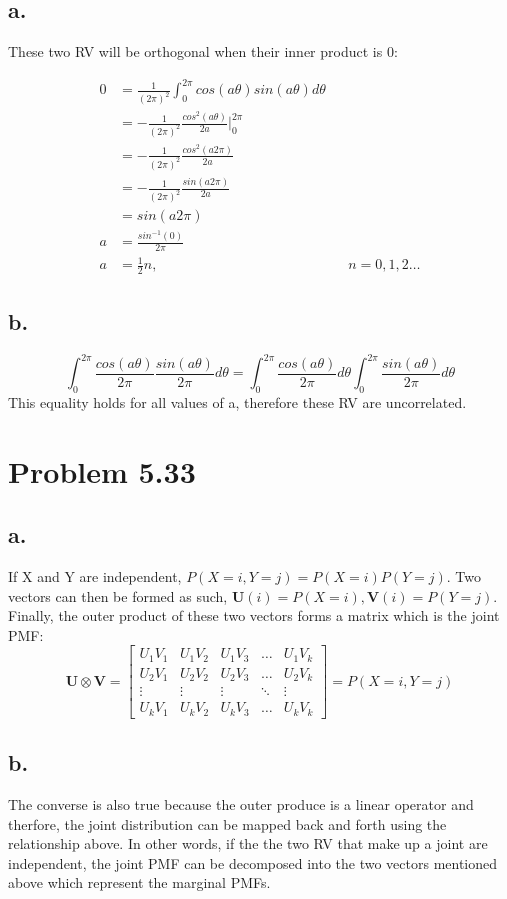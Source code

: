 \documentclass[12pt]{article}
\begin{document}
\subsection{a.}
These two RV will be orthogonal when their inner product is 0:

\begin{align*}
  0 &= \frac{1}{(2\pi)^2}\int_0^{2\pi} cos(a\theta)sin(a\theta) d\theta \\
  &= -\frac{1}{(2\pi)^2}\frac{cos^2(a\theta)}{2a}\big|_0^{2\pi} \\
  &= -\frac{1}{(2\pi)^2}\frac{cos^2(a2\pi)}{2a} \\
  &= -\frac{1}{(2\pi)^2}\frac{sin(a2\pi)}{2a} \\
  &= sin(a2\pi) \\
  a &= \frac{sin^{-1}(0)}{2\pi} \\
  a &= \frac{1}{2}n, & & n = 0, 1 , 2 \dots
\end{align*}

\subsection{b.}
\[\int_0^{2\pi} \frac{cos(a\theta)}{2\pi}\frac{sin(a\theta)}{2\pi} d\theta
  = \int_0^{2\pi} \frac{cos(a\theta)}{2\pi}d\theta \int_0^{2\pi}\frac{sin(a\theta)}{2\pi} d\theta \]
This equality holds for all values of a, therefore these RV are uncorrelated.

\section{Problem 5.33}
\subsection{a.}
If X and Y are independent, $P(X=i, Y=j) = P(X=i)P(Y=j)$. Two vectors can then be formed as such,
$\textbf{U}(i) = P(X=i), \textbf{V}(i) = P(Y=j)$. Finally, the outer product of these two vectors 
forms a matrix which is the joint PMF:
\[
  \textbf{U} \otimes \textbf{V} =
\begin{bmatrix}
    U_1V_1 & U_1V_2 & U_1V_3 & \dots  & U_1V_k \\
    U_2V_1 & U_2V_2 & U_2V_3 & \dots  & U_2V_k \\
    \vdots & \vdots & \vdots & \ddots & \vdots \\
    U_kV_1 & U_kV_2 & U_kV_3 & \dots  & U_kV_k
\end{bmatrix}
= P(X=i, Y=j)
\]

\subsection{b.}
The converse is also true because the outer produce is a linear operator and therfore, the joint distribution
can be mapped back and forth using the relationship above. In other words, if the the two RV that make up a joint
are independent, the joint PMF can be decomposed into the two vectors mentioned above which represent the marginal
PMFs. 
\end{document}
